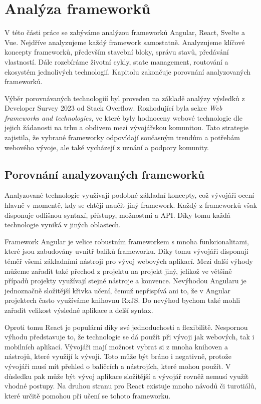 \section{Analýza frameworků}

V této části práce se zabýváme analýzou frameworků Angular, React, Svelte a Vue. Nejdříve analyzujeme každý framework samostatně. 
Analyzujeme klíčové koncepty frameworků, především stavební bloky, správu stavů, předávání vlastností. 
Dále rozebíráme životní cykly, state management, routování a ekosystém jednolivých technologií. 
Kapitolu zakončuje porovnání analyzovaných frameworků.

Výběr porovnávaných technologiíí byl proveden na základě analýzy výsledků z Developer Survey 2023 od Stack Overflow. 
Rozhodující byla sekce \emph{Web frameworks and technologies}, ve které byly hodnoceny webové technologie dle jejich žádanosti na trhu a obdivem mezi vývojářskou komunitou. 
Tato strategie zajistila, že vybrané frameworky odpovídají současným trendům a potřebám webového vývoje, ale také vycházejí z uznání a podpory komunity.\cite{stackoverflow, developersurvey}







\subsection{Porovnání analyzovaných frameworků}

Analyzované technologie využívají podobné základní koncepty, což vývojáři ocení hlavně v momentě, kdy se chtějí naučit jiný framework. 
Každý z frameworků však disponuje odlišnou syntaxí, přístupy, možnostmi a API. Díky tomu každá technologie vyniká v jiných oblastech.

Framework Angular je velice robustním frameworkem s mnoha funkcionalitami, které jsou zabudovány uvnitř balíků frameworku. 
Díky tomu vývojáři disponují téměř všemi základními nástroji pro vývoj webových aplikací. 
Mezi další výhody můžeme zařadit také přechod z projektu na projekt jiný, jelikož ve většině případů projekty využívají stejné nástroje a konvence. 
Nevýhodou Angularu je jednoznačně složitější křivka učení, čemuž nepřispívá ani to, že v Angular projektech často využíváme knihovnu RxJS. 
Do nevýhod bychom také mohli zařadit velikost výsledné aplikace a delší syntax.

Oproti tomu React je populární díky své jednoduchosti a flexibilitě. 
Nespornou výhodu představuje to, že technologie se dá použít při vývoji jak webových, tak i mobilních aplikací. 
Vývojáři mají možnost vybrat si z mnoha knihoven a nástrojů, které využijí k vývoji. 
Toto může být bráno i negativně, protože vývojáři musí mít přehled o balíčcích a nástrojích, které mohou použít. 
V důsledku pak může být vývoj aplikace složitější a vývojář rovněž nemusí využít vhodné postupy. 
Na druhou stranu pro React existuje mnoho návodů či turotiálů, které určitě pomohou při učení se tohoto frameworku.


